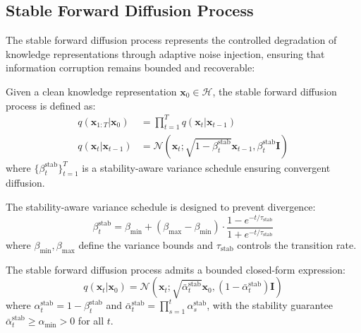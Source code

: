 \subsection{Stable Forward Diffusion Process}

The stable forward diffusion process represents the controlled degradation of knowledge representations through adaptive noise injection, ensuring that information corruption remains bounded and recoverable:

\begin{definition}
Given a clean knowledge representation $\mathbf{x}_0 \in \mathcal{H}$, the stable forward diffusion process is defined as:
\begin{align}
q(\mathbf{x}_{1:T} | \mathbf{x}_0) &= \prod_{t=1}^T q(\mathbf{x}_t | \mathbf{x}_{t-1}) \\
q(\mathbf{x}_t | \mathbf{x}_{t-1}) &= \mathcal{N}(\mathbf{x}_t; \sqrt{1-\beta_t^{\text{stab}}}\mathbf{x}_{t-1}, \beta_t^{\text{stab}} \mathbf{I})
\end{align}
where $\{\beta_t^{\text{stab}}\}_{t=1}^T$ is a stability-aware variance schedule ensuring convergent diffusion.
\end{definition}

\begin{definition}
The stability-aware variance schedule is designed to prevent divergence:
\begin{equation}
\beta_t^{\text{stab}} = \beta_{\min} + (\beta_{\max} - \beta_{\min}) \cdot \frac{1 - e^{-t/\tau_{\text{stab}}}}{1 + e^{-t/\tau_{\text{stab}}}}
\end{equation}
where $\beta_{\min}, \beta_{\max}$ define the variance bounds and $\tau_{\text{stab}}$ controls the transition rate.
\end{definition}

\begin{theorem}
The stable forward diffusion process admits a bounded closed-form expression:
\begin{equation}
q(\mathbf{x}_t | \mathbf{x}_0) = \mathcal{N}(\mathbf{x}_t; \sqrt{\bar{\alpha}_t^{\text{stab}}}\mathbf{x}_0, (1-\bar{\alpha}_t^{\text{stab}})\mathbf{I})
\end{equation}
where $\alpha_t^{\text{stab}} = 1 - \beta_t^{\text{stab}}$ and $\bar{\alpha}_t^{\text{stab}} = \prod_{s=1}^t \alpha_s^{\text{stab}}$, with the stability guarantee $\bar{\alpha}_t^{\text{stab}} \geq \alpha_{\min} > 0$ for all $t$.
\end{theorem}

